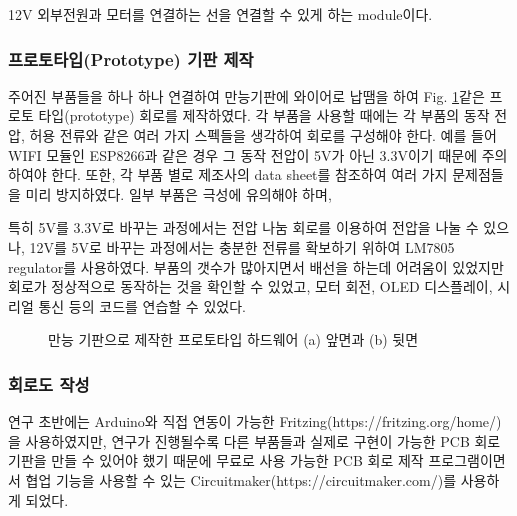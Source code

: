 \begin{description}[font=$\bullet$~\normalfont\scshape\color{red!50!black}]
	\item [TE Connectivity/AMP 5525258-3 및 Wurth Elektronik 694106301002] 12V 외부전원과 모터를 연결하는 선을 연결할 수 있게 하는 module이다.
\end{description}

\subsubsection{프로토타입(Prototype) 기판 제작}

주어진 부품들을 하나 하나 연결하여 만능기판에 와이어로 납땜을 하여 Fig. \ref{fig:prototype}\과 같은 프로토 타입(prototype) 회로를 제작하였다. 각 부품을 사용할 때에는 각 부품의 동작 전압, 허용 전류와 같은 여러 가지 스펙들을 생각하여 회로를 구성해야 한다. 예를 들어 WIFI 모듈인 ESP8266과 같은 경우 그 동작 전압이 5V가 아닌 3.3V이기 때문에 주의하여야 한다. 또한, 각 부품 별로 제조사의 data sheet를 참조하여 여러 가지 문제점들을 미리 방지하였다. 일부 부품은 극성에 유의해야 하며, 

특히 5V를 3.3V로 바꾸는 과정에서는 전압 나눔 회로를 이용하여 전압을 나눌 수 있으나, 12V를 5V로 바꾸는 과정에서는 충분한 전류를 확보하기 위하여 LM7805 regulator를 사용하였다. 부품의 갯수가 많아지면서 배선을 하는데 어려움이 있었지만 회로가 정상적으로 동작하는 것을 확인할 수 있었고, 모터 회전, OLED 디스플레이, 시리얼 통신 등의 코드를 연습할 수 있었다.

\begin{figure}[h]
	\begin{center}
		\caption{만능 기판으로 제작한 프로토타입 하드웨어 (a) 앞면과 (b) 뒷면}
		\label{fig:prototype}
	\end{center}
\end{figure}


\subsubsection{회로도 작성}

연구 초반에는 Arduino와 직접 연동이 가능한 Fritzing(https://fritzing.org/home/)을 사용하였지만, 연구가 진행될수록 다른 부품들과 실제로 구현이 가능한 PCB 회로기판을 만들 수 있어야 했기 때문에 무료로 사용 가능한 PCB 회로 제작 프로그램이면서 협업 기능을 사용할 수 있는 Circuitmaker(https://circuitmaker.com/)를 사용하게 되었다. 

